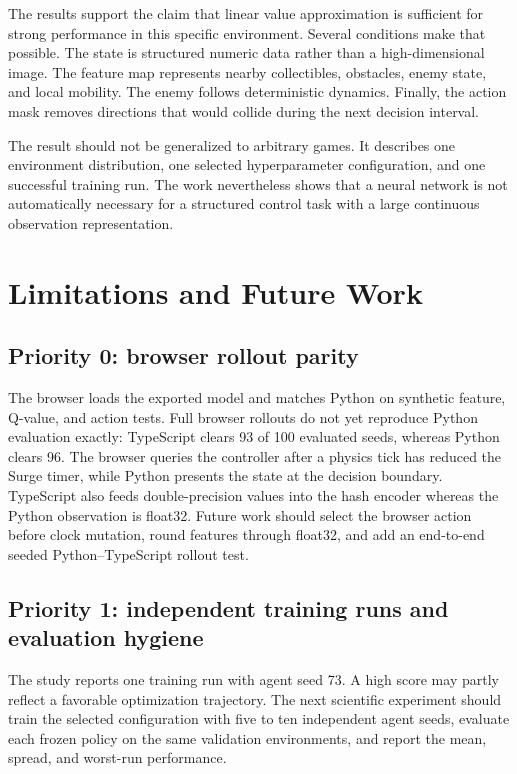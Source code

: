 \documentclass[11pt]{article}
\begin{document}
The results support the claim that linear value approximation is sufficient for
strong performance in this specific environment. Several conditions make that
possible. The state is structured numeric data rather than a high-dimensional
image. The feature map represents nearby collectibles, obstacles, enemy state,
and local mobility. The enemy follows deterministic dynamics. Finally, the
action mask removes directions that would collide during the next decision
interval.

The result should not be generalized to arbitrary games. It describes one
environment distribution, one selected hyperparameter configuration, and one
successful training run. The work nevertheless shows that a neural network is
not automatically necessary for a structured control task with a large
continuous observation representation.

\section{Limitations and Future Work}

\subsection{Priority 0: browser rollout parity}

The browser loads the exported model and matches Python on synthetic feature,
Q-value, and action tests. Full browser rollouts do not yet reproduce Python
evaluation exactly: TypeScript clears 93 of 100 evaluated seeds, whereas Python
clears 96. The browser queries the controller after a physics tick has reduced
the Surge timer, while Python presents the state at the decision boundary.
TypeScript also feeds double-precision values into the hash encoder whereas the
Python observation is float32. Future work should select the browser action
before clock mutation, round features through float32, and add an end-to-end
seeded Python--TypeScript rollout test.

\subsection{Priority 1: independent training runs and evaluation hygiene}

The study reports one training run with agent seed 73. A high score may partly
reflect a favorable optimization trajectory. The next scientific experiment
should train the selected configuration with five to ten independent agent
seeds, evaluate each frozen policy on the same validation environments, and
report the mean, spread, and worst-run performance.
\end{document}
